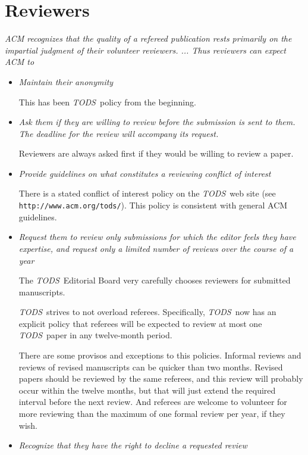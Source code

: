 \documentclass{article}
\newcommand{\tods}{{\em TODS\/}}
\begin{document}
\section{Reviewers}

\noindent
{\em ACM recognizes that the quality of a refereed publication rests primarily on
the impartial judgment of their volunteer reviewers. ... Thus reviewers can
expect ACM to}

\begin{itemize}
\item {\em Maintain their anonymity}

  This has been \tods\ policy from the beginning.

\item {\em Ask them if they are willing to review before the submission is
  sent to them. The deadline for the review will accompany its request.}

  Reviewers are always asked first if they would be willing to review a paper.

\item {\em Provide guidelines on what constitutes a reviewing conflict of
  interest}

  There is a stated conflict of interest policy on the \tods\ web site (see
  {\tt http://www.acm.org/tods/}). This policy is consistent with
  general ACM guidelines.

\item {\em Request them to review only submissions for which the editor
  feels they have expertise, and request only a limited number of reviews
  over the course of a year}

   The \tods\ Editorial Board very carefully chooses reviewers for submitted
   manuscripts.

   \tods\ strives to not overload referees. Specifically, \tods\ now has an
   explicit policy that referees will be expected to review at most one
   \tods\ paper in any twelve-month period.

   There are some provisos and exceptions to this policies. Informal
reviews and reviews of revised manuscripts can be quicker than two
months. Revised papers should be reviewed by the same referees, and this
review will probably occur within the twelve months, but that will just
extend the required interval before the next review. And referees are
welcome to volunteer for more reviewing than the maximum of one formal
review per year, if they wish.

\item {\em Recognize that they have the right to decline a requested review}


\end{itemize}
\end{document}
